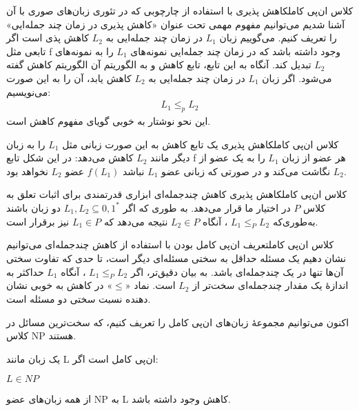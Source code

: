 \begin{itemframe-s}{کلاس ان‌پی کامل}{کاهش پذیری}
\itm
با استفاده از چارچوبی که در تئوری زبان‌های صوری با آن آشنا شدیم می‌توانیم مفهوم مهمی تحت عنوان «کاهش پذیری در زمان چند جمله‌ایی»
را تعریف کنیم.
\itm
می‌گوییم زبان $ L_1 $ در زمان چند جمله‌ایی به $ L_2 $  کاهش پذی است  اگر تابعی مثل f وجود داشته باشد که در زمان چند جمله‌ایی نمونه‌های $ L_1 $ را به نمونه‌های $ L_2 $ تبدیل کند. آنگاه به این تابع، تابع کاهش
و به الگوریتم آن الگوریتم کاهش
گفته می‌شود.
\itm
اگر زبان $ L_1 $ در زمان چند جمله‌ایی به $ L_2 $ کاهش یابد، آن را به این صورت می‌نویسیم:
\begin{align*}
L_1 \leq_p L_2
\end{align*}
 این نحو نوشتار به خوبی گویای مفهوم کاهش است.
\end{itemframe-s}

\begin{itemframe-s}{کلاس ان‌پی کامل}{کاهش پذیری}
\itm
یک تابع کاهش به این صورت زبانی مثل
$L_1$
را به زبان دیگر مانند
$L_2$
کاهش می‌دهد:
 \itm
در این شکل تابع f هر عضو از زبان  $ L_1 $ را به یک عضو از $ L_2 $ نگاشت می‌کند و در صورتی که زبانی عضو  $ L_1 $  نباشد $ f(L_1)$ عضو $ L_2 $ نخواهد بود.
\end{itemframe-s}

\begin{itemframe-s}{کلاس ان‌پی کامل}{کاهش پذیری}
\itm
کاهش چندجمله‌ای ابزاری قدرتمندی برای اثبات تعلق به کلاس $P$ در اختیار ما قرار می‌دهد.
\itm
به طوری که اگر
$L_1, L_2 \subseteq {0,1}^*$
دو زبان باشند به‌طوری‌که
$L_1 \leq_P L_2$
، آنگاه
$L_2 \in P$
 نتیجه می‌دهد که
$L_1 \in P$
نیز برقرار است.
\end{itemframe-s}

\begin{itemframe-s}{کلاس ان‌پی کامل}{تعریف ان‌پی کامل بودن}
\itm
با استفاده از کاهش چندجمله‌ای می‌توانیم نشان دهیم یک مسئله حداقل به سختی مسئله‌ای دیگر است، تا حدی که تفاوت سختی آن‌ها تنها در یک چندجمله‌ای باشد.
\itm
 به بیان دقیق‌تر، اگر
 $L_1 \leq_P L_2$
، آنگاه
$L_1$
 حداکثر به اندازهٔ یک مقدار چندجمله‌ای سخت‌تر از
$L_2$
 است. نماد «$\leq$» در کاهش به خوبی نشان دهنده نسبت سختی دو مسئله است.

\itm
اکنون می‌توانیم مجموعهٔ زبان‌های ان‌پی کامل را تعریف کنیم، که سخت‌ترین مسائل در کلاس NP هستند.

یک زبان مانند L ان‌پی کامل است اگر:
\item[1]
$L \in NP$
\item[2]
از همه زبان‌های عضو NP  به L کاهش وجود داشته باشد.
\end{itemframe-s}



